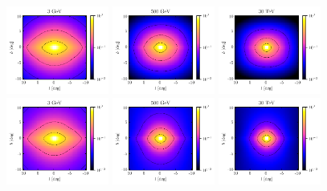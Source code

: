 \documentclass[doublespace,nopageskip]{VTthesis} %
\begin{document}
\begin{figure}[htb]
    \centering
    \includegraphics[width=0.3\textwidth]{Figures/IC_MSPs/skymap_bulge_3gev.pdf}
    \includegraphics[width=0.3\textwidth]{Figures/IC_MSPs/skymap_bulge_500gev.pdf}
    \includegraphics[width=0.3\textwidth]{Figures/IC_MSPs/skymap_bulge_30tev.pdf}
    \includegraphics[width=0.3\textwidth]{Figures/IC_MSPs/skymap_nfw_3gev.pdf}
    \includegraphics[width=0.3\textwidth]{Figures/IC_MSPs/skymap_nfw_500gev.pdf}
    \includegraphics[width=0.3\textwidth]{Figures/IC_MSPs/skymap_nfw_30tev.pdf}

\end{figure}
\end{document}
